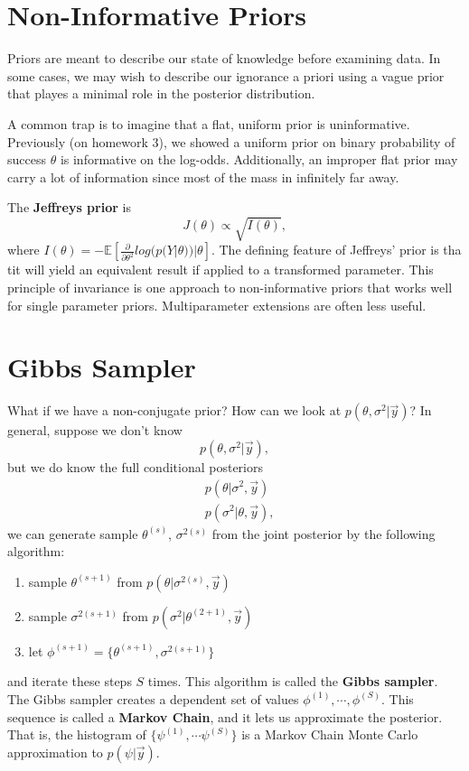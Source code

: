 \documentclass[titlepage, 12pt, leqno]{article}
\begin{document}
\pagebreak
\section{Non-Informative Priors}
Priors are meant to describe our state of knowledge before examining data. In
some cases, we may wish to describe our ignorance a priori using a vague prior
that playes a minimal role in the posterior distribution.

A common trap is to imagine that a flat, uniform prior is uninformative. 
Previously (on homework 3), we showed a uniform prior on binary probability of
success $\theta$ is informative on the log-odds. Additionally, an improper flat
prior may carry a lot of information since most of the mass in infinitely far
away.
\begin{definition}
    The \textbf{Jeffreys prior} is
    \[
    J(\theta) \propto \sqrt{I(\theta)},
    \]
    where $I(\theta) = - \mathbb{E}[\frac{\partial}{\partial \theta^{2}}
    log(p(Y|\theta)) | \theta]$. The defining feature of Jeffreys' prior is
    tha tit will yield an equivalent result if applied to a transformed 
    parameter. This principle of invariance is one approach to non-informative
    priors that works well for single parameter priors. Multiparameter 
    extensions are often less useful.
\end{definition}

\pagebreak
\section{Gibbs Sampler}
What if we have a non-conjugate prior? How can we look at $p(\theta,\sigma^{2}|
\vec y)$? In general, suppose we don't know
\[
p(\theta,\sigma^{2}|\vec y),
\]
but we do know the full conditional posteriors
\begin{align*}
    &p(\theta|\sigma^{2},\vec y)\\
    &p(\sigma^{2}|\theta, \vec y),
\end{align*}
we can generate sample $\theta^{(s)}$, $\sigma^{2(s)}$ from the joint
posterior by the following algorithm:
\begin{enumerate}
    \item sample $\theta^{(s+1)}$ from $p(\theta|\sigma^{2(s)},\vec y)$
    \item sample $\sigma^{2(s+1)}$ from $p(\sigma^{2}|\theta^{(2+1)}, \vec y)$
    \item let $\phi^{(s+1)} = \{\theta^{(s+1)}, \sigma^{2(s+1)}\}$
\end{enumerate}
and iterate these steps $S$ times. This algorithm is called the \textbf{Gibbs
sampler}. The Gibbs sampler creates a dependent set of values $\phi^{(1)},
\cdots , \phi^{(S)}$. This sequence is called a \textbf{Markov Chain}, and it
lets us approximate the posterior. That is, the histogram of $\{\psi^{(1)},
\cdots \psi^{(S)}\}$ is a Markov Chain Monte Carlo approximation to
$p(\psi|\vec y)$.
\end{document}
